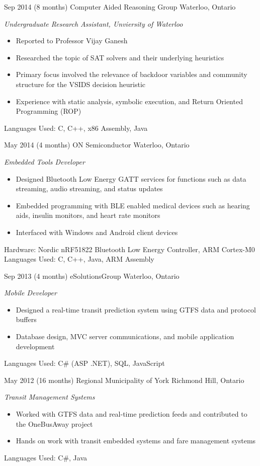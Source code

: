 \documentclass[print]{friggeri-cv} %
\begin{document}
\begin{entrylist}

\entry
{Sep 2014}
{(8 months)}
{Computer Aided Reasoning Group}
{Waterloo, Ontario}
{\emph{Undergraduate Research Assistant, Unviersity of Waterloo}
\begin{itemize}
\item Reported to Professor Vijay Ganesh 
\item Researched the topic of SAT solvers and their underlying heuristics
\item Primary focus involved the relevance of backdoor variables and community structure for the VSIDS decision heuristic
\item Experience with static analysis, symbolic execution, and Return Oriented Programming (ROP) 
\end{itemize}
Languages Used: C, C++, x86 Assembly, Java \\
}

\entry
{May 2014}
{(4 months)}
{ON Semiconductor}
{Waterloo, Ontario}
{\emph{Embedded Tools Developer}
\begin{itemize}
\item Designed Bluetooth Low Energy GATT services for functions such as data streaming, audio streaming, and status updates
\item Embedded programming with BLE enabled medical devices such as hearing aids, insulin monitors, and heart rate monitors
\item Interfaced with Windows and Android client devices
\end{itemize}
Hardware: Nordic nRF51822 Bluetooth Low Energy Controller, ARM Cortex-M0 \\
Languages Used: C, C++, Java, ARM Assembly \\
}

\entry
{Sep 2013}
{(4 months)}
{eSolutionsGroup}
{Waterloo, Ontario}
{\emph{Mobile Developer}
\begin{itemize}
\item Designed a real-time transit prediction system using GTFS data and protocol buffers
\item Database design, MVC server communications, and mobile application development
\end{itemize}
Languages Used: C\# (ASP .NET), SQL, JavaScript \\
}

\entry
{May 2012}
{(16 months)}
{Regional Municipality of York}
{Richmond Hill, Ontario}
{\emph{Transit Management Systems}
\begin{itemize}
\item Worked with GTFS data and real-time prediction feeds and contributed to the OneBusAway project
\item Hands on work with transit embedded systems and fare management systems
\end{itemize}
Languages Used: C\#, Java \\
}

\end{entrylist}
\end{document}
